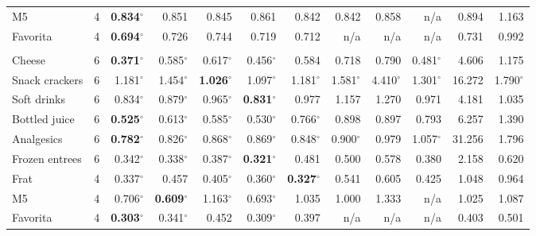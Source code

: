 \begin{table}[t]
\begin{tabular}{lc*{10}{r}}
M5 & 4 & \textbf{0.834}$^{\circ}$ & 0.851 & 0.845 & 0.861 & 0.842 & 0.842 & 0.858 & n/a & 0.894 & 1.163 \\
Favorita & 4 & \textbf{0.694}$^{\circ}$ & 0.726 & 0.744 & 0.719 & 0.712 & n/a & n/a & n/a & 0.731 & 0.992 \\
\addlinespace[2pt]\multicolumn{12}{l}{\itshape Total} \\
Cheese & 6 & \textbf{0.371}$^{\circ}$ & 0.585$^{\circ}$ & 0.617$^{\circ}$ & 0.456$^{\circ}$ & 0.584 & 0.718 & 0.790 & 0.481$^{\circ}$ & 4.606 & 1.175 \\
Snack crackers & 6 & 1.181$^{\circ}$ & 1.454$^{\circ}$ & \textbf{1.026}$^{\circ}$ & 1.097$^{\circ}$ & 1.181$^{\circ}$ & 1.581$^{\circ}$ & 4.410$^{\circ}$ & 1.301$^{\circ}$ & 16.272 & 1.790$^{\circ}$ \\
Soft drinks & 6 & 0.834$^{\circ}$ & 0.879$^{\circ}$ & 0.965$^{\circ}$ & \textbf{0.831}$^{\circ}$ & 0.977 & 1.157 & 1.270 & 0.971 & 4.181 & 1.035 \\
Bottled juice & 6 & \textbf{0.525}$^{\circ}$ & 0.613$^{\circ}$ & 0.585$^{\circ}$ & 0.530$^{\circ}$ & 0.766$^{\circ}$ & 0.898 & 0.897 & 0.793 & 6.257 & 1.390 \\
Analgesics & 6 & \textbf{0.782}$^{\circ}$ & 0.826$^{\circ}$ & 0.868$^{\circ}$ & 0.869$^{\circ}$ & 0.848$^{\circ}$ & 0.900$^{\circ}$ & 0.979 & 1.057$^{\circ}$ & 31.256 & 1.796 \\
Frozen entrees & 6 & 0.342$^{\circ}$ & 0.338$^{\circ}$ & 0.387$^{\circ}$ & \textbf{0.321}$^{\circ}$ & 0.481 & 0.500 & 0.578 & 0.380 & 2.158 & 0.620 \\
Frat & 4 & 0.337$^{\circ}$ & 0.457 & 0.405$^{\circ}$ & 0.360$^{\circ}$ & \textbf{0.327}$^{\circ}$ & 0.541 & 0.605 & 0.425 & 1.048 & 0.964 \\
M5 & 4 & 0.706$^{\circ}$ & \textbf{0.609}$^{\circ}$ & 1.163$^{\circ}$ & 0.693$^{\circ}$ & 1.035 & 1.000 & 1.333 & n/a & 1.025 & 1.087 \\
Favorita & 4 & \textbf{0.303}$^{\circ}$ & 0.341$^{\circ}$ & 0.452 & 0.309$^{\circ}$ & 0.397 & n/a & n/a & n/a & 0.403 & 0.501 \\
\bottomrule
\end{tabular}
\end{table}
